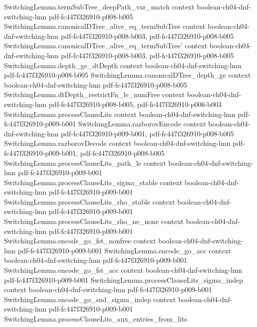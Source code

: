 \begin{lemma}
\proofstep
  {SwitchingLemma.termSubTree_deepPath_var_match}
  {context}
  {boolean-ch04-dnf-switching-lmn}
  {pdf-fc447f326910-p008-b005}
\proofstep
  {SwitchingLemma.canonicalDTree_alive_eq_termSubTree}
  {context}
  {boolean-ch04-dnf-switching-lmn}
  {pdf-fc447f326910-p008-b003,
    pdf-fc447f326910-p008-b005}
\proofstep
  {SwitchingLemma.canonicalDTree_alive_eq_termSubTree'}
  {context}
  {boolean-ch04-dnf-switching-lmn}
  {pdf-fc447f326910-p008-b003,
    pdf-fc447f326910-p008-b005}
\proofstep
  {SwitchingLemma.depth_ge_dtDepth}
  {context}
  {boolean-ch04-dnf-switching-lmn}
  {pdf-fc447f326910-p008-b005}
\proofstep
  {SwitchingLemma.canonicalDTree_depth_ge}
  {context}
  {boolean-ch04-dnf-switching-lmn}
  {pdf-fc447f326910-p008-b005}
\proofstep
  {SwitchingLemma.dtDepth_restrictFn_le_numFree}
  {context}
  {boolean-ch04-dnf-switching-lmn}
  {pdf-fc447f326910-p008-b005,
    pdf-fc447f326910-p006-b003}
\proofstep
  {SwitchingLemma.processClauseLits}
  {context}
  {boolean-ch04-dnf-switching-lmn}
  {pdf-fc447f326910-p009-b001}
\proofstep
  {SwitchingLemma.razborovEncode}
  {context}
  {boolean-ch04-dnf-switching-lmn}
  {pdf-fc447f326910-p009-b001,
    pdf-fc447f326910-p008-b005}
\proofstep
  {SwitchingLemma.razborovDecode}
  {context}
  {boolean-ch04-dnf-switching-lmn}
  {pdf-fc447f326910-p009-b001,
    pdf-fc447f326910-p008-b005}
\proofstep
  {SwitchingLemma.processClauseLits_path_le}
  {context}
  {boolean-ch04-dnf-switching-lmn}
  {pdf-fc447f326910-p009-b001}
\proofstep
  {SwitchingLemma.processClauseLits_sigma_stable}
  {context}
  {boolean-ch04-dnf-switching-lmn}
  {pdf-fc447f326910-p009-b001}
\proofstep
  {SwitchingLemma.processClauseLits_rho_stable}
  {context}
  {boolean-ch04-dnf-switching-lmn}
  {pdf-fc447f326910-p009-b001}
\proofstep
  {SwitchingLemma.processClauseLits_rho_ne_none}
  {context}
  {boolean-ch04-dnf-switching-lmn}
  {pdf-fc447f326910-p009-b001}
\proofstep
  {SwitchingLemma.encode_go_fst_nonfree}
  {context}
  {boolean-ch04-dnf-switching-lmn}
  {pdf-fc447f326910-p009-b001}
\proofstep
  {SwitchingLemma.encode_go_acc}
  {context}
  {boolean-ch04-dnf-switching-lmn}
  {pdf-fc447f326910-p009-b001}
\proofstep
  {SwitchingLemma.encode_go_fst_acc}
  {context}
  {boolean-ch04-dnf-switching-lmn}
  {pdf-fc447f326910-p009-b001}
\proofstep
  {SwitchingLemma.processClauseLits_sigma_indep}
  {context}
  {boolean-ch04-dnf-switching-lmn}
  {pdf-fc447f326910-p009-b001}
\proofstep
  {SwitchingLemma.encode_go_snd_sigma_indep}
  {context}
  {boolean-ch04-dnf-switching-lmn}
  {pdf-fc447f326910-p009-b001}
\proofstep
  {SwitchingLemma.processClauseLits_aux_entries_from_lits}

\end{lemma}
